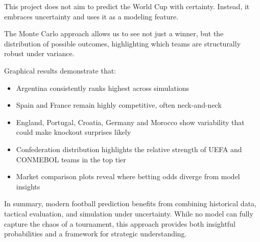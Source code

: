 \documentclass[11pt,a4paper]{article}
\begin{document}
This project does not aim to predict the World Cup with certainty. Instead, it embraces uncertainty and uses it as a modeling feature.

The Monte Carlo approach allows us to see not just a winner, but the distribution of possible outcomes, highlighting which teams are structurally robust under variance.

Graphical results demonstrate that:
\begin{itemize}
    \item Argentina consistently ranks highest across simulations
    \item Spain and France remain highly competitive, often neck-and-neck
    \item England, Portugal, Croatia, Germany and Morocco show variability that could make knockout surprises likely
    \item Confederation distribution highlights the relative strength of UEFA and CONMEBOL teams in the top tier
    \item Market comparison plots reveal where betting odds diverge from model insights
\end{itemize}

In summary, modern football prediction benefits from combining historical data, tactical evaluation, and simulation under uncertainty. While no model can fully capture the chaos of a tournament, this approach provides both insightful probabilities and a framework for strategic understanding.
\end{document}

